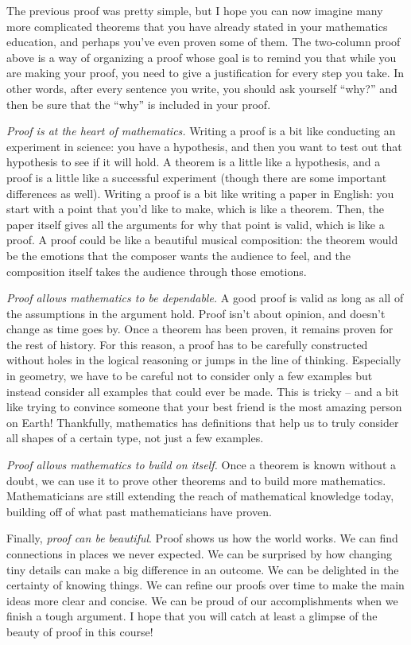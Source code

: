 \documentclass{ximera}
\begin{document}
The previous proof was pretty simple, but I hope you can now imagine many more complicated theorems that you have already stated in your mathematics education, and perhaps you've even proven some of them. The two-column proof above is a way of organizing a proof whose goal is to remind you that while you are making your proof, you need to give a justification for every step you take. In other words, after every sentence you write, you should ask yourself ``why?'' and then be sure that the ``why'' is included in your proof.

\emph{Proof is at the heart of mathematics.} Writing a proof is a bit like conducting an experiment in science: you have a hypothesis, and then you want to test out that hypothesis to see if it will hold. A theorem is a little like a hypothesis, and a proof is a little like a successful experiment (though there are some important differences as well). Writing a proof is a bit like writing a paper in English: you start with a point that you'd like to make, which is like a theorem. Then, the paper itself gives all the arguments for why that point is valid, which is like a proof. A proof could be like a beautiful musical composition: the theorem would be the emotions that the composer wants the audience to feel, and the composition itself takes the audience through those emotions.

 \emph{Proof allows mathematics to be dependable.} A good proof is valid as long as all of the assumptions in the argument hold. Proof isn't about opinion, and doesn't change as time goes by. Once a theorem has been proven, it remains proven for the rest of history. For this reason, a proof has to be carefully constructed without holes in the logical reasoning or jumps in the line of thinking. Especially in geometry, we have to be careful not to consider only a few examples but instead consider all examples that could ever be made. This is tricky -- and a bit like trying to convince someone that your best friend is the most amazing person on Earth! Thankfully, mathematics has definitions that help us to truly consider all shapes of a certain type, not just a few examples.
 
\emph{Proof allows mathematics to build on itself.} Once a theorem is known without a doubt, we can use it to prove other theorems and to build more mathematics. Mathematicians are still extending the reach of mathematical knowledge today, building off of what past mathematicians have proven.
 
 Finally, \emph{proof can be beautiful}. Proof shows us how the world works. We can find connections in places we never expected. We can be surprised by how changing tiny details can make a big difference in an outcome. We can be delighted in the certainty of knowing things. We can refine our proofs over time to make the main ideas more clear and concise. We can be proud of our accomplishments when we finish a tough argument.  I hope that you will catch at least a glimpse of the beauty of proof in this course!
\end{document}
